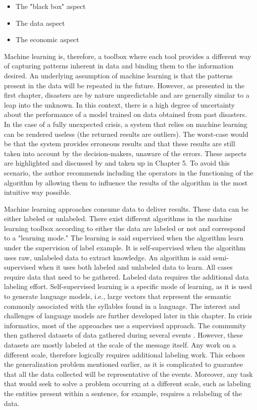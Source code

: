\begin{itemize}
    \item The "black box" aspect
    \item The data aspect
    \item The economic aspect
\end{itemize}

Machine learning is, therefore, a toolbox where each tool provides a different way of capturing patterns inherent in data and binding them to the information desired.
An underlying assumption of machine learning is that the patterns present in the data will be repeated in the future.
However, as presented in the first chapter, disasters are by nature unpredictable and are generally similar to a leap into the unknown.
In this context, there is a high degree of uncertainty about the performance of a model trained on data obtained from past disasters.
In the case of a fully unexpected crisis, a system that relies on machine learning can be rendered useless (the returned results are outliers).
The worst-case would be that the system provides erroneous results and that these results are still taken into account by the decision-makers, unaware of the errors.
These aspects are highlighted and discussed by \textcite{endsleyDesigningSituationAwareness2016} and taken up in Chapter 5.
To avoid this scenario, the author recommends including the operators in the functioning of the algorithm by allowing them to influence the results of the algorithm in the most intuitive way possible.

Machine learning approaches consume data to deliver results.
These data can be either labeled or unlabeled.
There exist different algorithms in the machine learning toolbox according to either the
data are labeled or not and correspond to a "learning mode."
The learning is said supervised when the algorithm learn under the supervision of label
example.
It is self-supervised when the algorithm uses raw, unlabeled data to extract knowledge.
An algorithm is said semi-supervised when it uses both labeled and unlabeled data to learn.
All cases require data that need to be gathered.
Labeled data requires the additional data labeling effort.
Self-supervised learning is a specific mode of learning, as it is used to generate language
models, i.e., large vectors that represent the semantic commonly associated with the syllables
found in a language.
The interest and challenges of language models are further developed later in this chapter.
In crisis informatics, most of the approaches use a supervised approach.
The community then gathered datasets of data gathered during several events \parencite{olteanuCrisisLexLexiconCollecting2014,olteanuWhatExpectWhen2015}.
However, these datasets are mostly labeled at the scale of the message itself.
Any work on a different scale, therefore logically requires additional labeling work.
This echoes the generalization problem mentioned earlier, as it is complicated to guarantee
that all the data collected will be representative of the events.
Moreover, any task that would seek to solve a problem occurring at a different scale,
such as labeling the entities present within a sentence, for example, requires a relabeling
of the data.

